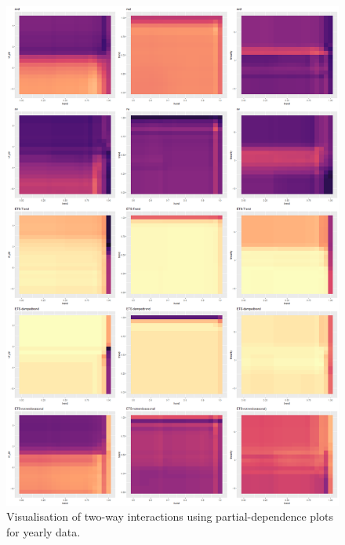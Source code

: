 \documentclass[11pt,a4paper,]{article}
\theoremstyle{definition}
\theoremstyle{definition}
\theoremstyle{definition}
\theoremstyle{remark}
\begin{document}
\begin{figure}
\centering
\includegraphics{figures/twowayinteractionyearly1-1.png}
\caption{\label{fig:twowayinteractionyearly1}Visualisation of two-way
interactions using partial-dependence plots for yearly data.}
\end{figure}

\newpage
\end{document}
